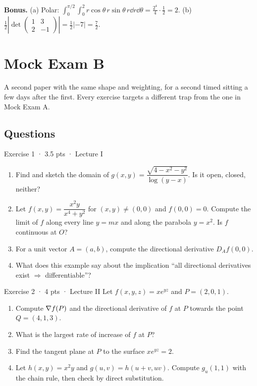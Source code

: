 \textbf{Bonus.}
(a) Polar: $\int_0^{\pi/2}\!\!\int_0^2 r\cos\theta\,r\sin\theta\,r\dd r\dd\theta=\frac{2^4}{4}\cdot\frac12=2$.
(b) $\tfrac12\left|\det\begin{pmatrix}1&3\\2&-1\end{pmatrix}\right|=\tfrac12|-7|=\tfrac72$.

\chapter{Mock Exam B}\label{ch:mockb}

\begin{examnote}
A second paper with the same shape and weighting, for a second timed sitting a few days after the
first. Every exercise targets a different trap from the one in Mock Exam A.
\end{examnote}

\section*{Questions}

\begin{problem}{Exercise 1 · 3.5 pts · Lecture I}
\begin{enumerate}[label=(\alph*)]
  \item Find and sketch the domain of $g(x,y)=\dfrac{\sqrt{4-x^2-y^2}}{\log(y-x)}$. Is it open, closed, neither?
  \item Let $f(x,y)=\dfrac{x^2y}{x^4+y^2}$ for $(x,y)\ne(0,0)$ and $f(0,0)=0$. Compute the limit of $f$ along
  every line $y=mx$ and along the parabola $y=x^2$. Is $f$ continuous at $O$?
  \item For a unit vector $A=(a,b)$, compute the directional derivative $D_Af(0,0)$.
  \item What does this example say about the implication ``all directional derivatives exist
  $\Rightarrow$ differentiable''?
\end{enumerate}
\end{problem}

\begin{problem}{Exercise 2 · 4 pts · Lecture II}
Let $f(x,y,z)=xe^{yz}$ and $P=(2,0,1)$.
\begin{enumerate}[label=(\alph*)]
  \item Compute $\nabla f(P)$ and the directional derivative of $f$ at $P$ towards the point $Q=(4,1,3)$.
  \item What is the largest rate of increase of $f$ at $P$?
  \item Find the tangent plane at $P$ to the surface $xe^{yz}=2$.
  \item Let $h(x,y)=x^2y$ and $g(u,v)=h(u+v,uv)$. Compute $g_u(1,1)$ with the chain rule, then check
  by direct substitution.
\end{enumerate}
\end{problem}


